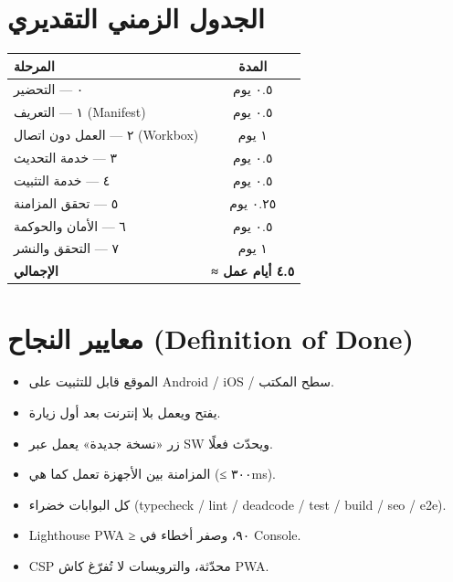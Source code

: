 \documentclass[11pt]{article}
\begin{document}
\section{الجدول الزمني التقديري}
\begin{center}
\renewcommand{\arraystretch}{1.3}
\begin{tabular}{@{}p{7cm} c@{}}
\toprule
\textbf{المرحلة} & \textbf{المدة} \\
\midrule
٠ — التحضير & ٠.٥ يوم \\
١ — التعريف (Manifest) & ٠.٥ يوم \\
٢ — العمل دون اتصال (Workbox) & ١ يوم \\
٣ — خدمة التحديث & ٠.٥ يوم \\
٤ — خدمة التثبيت & ٠.٥ يوم \\
٥ — تحقق المزامنة & ٠.٢٥ يوم \\
٦ — الأمان والحوكمة & ٠.٥ يوم \\
٧ — التحقق والنشر & ١ يوم \\
\midrule
\textbf{الإجمالي} & \textbf{≈ ٤.٥ أيام عمل} \\
\bottomrule
\end{tabular}
\end{center}

\section{معايير النجاح (Definition of Done)}
\begin{okbox}
\begin{itemize}
\item[\faCheck] الموقع قابل للتثبيت على Android / iOS / سطح المكتب.
\item[\faCheck] يفتح ويعمل بلا إنترنت بعد أول زيارة.
\item[\faCheck] زر «نسخة جديدة» يعمل عبر SW ويحدّث فعلًا.
\item[\faCheck] المزامنة بين الأجهزة تعمل كما هي (≤ ٣٠٠ms).
\item[\faCheck] كل البوابات خضراء (typecheck / lint / deadcode / test / build / seo / e2e).
\item[\faCheck] Lighthouse PWA ≥ ٩٠، وصفر أخطاء في Console.
\item[\faCheck] CSP محدّثة، والترويسات لا تُفرّغ كاش PWA.
\end{itemize}
\end{okbox}

\end{document}
